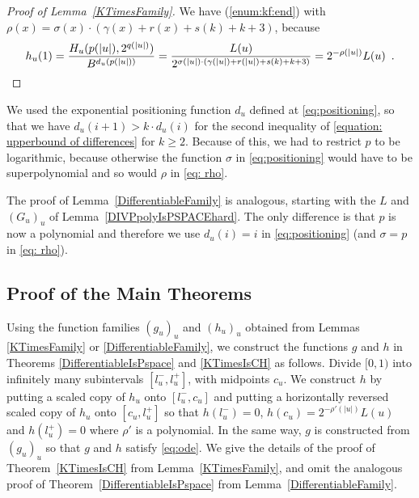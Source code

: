 \begin{proof}[Proof of Lemma~\ref{KTimesFamily}]
We have (\ref{enum:kf:end}) with
  $\rho(x) = \sigma(x) \cdot (\gamma(x)+r(x)+s(k)+k+3)$, because
  \begin{equation}
\label{eq: rho}
   h_u(1) 
   = \frac{H_u(p(|u|), 2^{q(|u|)})}{B^{d_u(p(|u|))}} 
   = \frac{L(u)}{2^{\sigma(|u|) \cdot (\gamma(|u|)+r(|u|)+s(k)+k+3)}} 
   = 2^{-\rho(|u|)} L(u)  \enspace . \qedhere
  \end{equation}
\end{proof}

We used the exponential positioning function $d _u$ 
defined at \eqref{eq:positioning}, 
so that we have $d _u (i + 1) > k \cdot d _u (i)$ for the 
second inequality of \eqref{equation: upperbound of differences}
for $k \geq 2$. 
Because of this, we had to restrict $p$ to be logarithmic, 
because otherwise the function $\sigma$ in \eqref{eq:positioning}
would have to be superpolynomial and so would $\rho$ in \eqref{eq: rho}. 

The proof of Lemma~\ref{DifferentiableFamily} is analogous, 
starting with the $L$ and $(G_u)_u$ of Lemma~\ref{DIVPpolyIsPSPACEhard}. 
The only difference is that $p$ is now a polynomial 
and therefore we use $d _u (i) = i$ in \eqref{eq:positioning}
(and $\sigma = p$ in \eqref{eq: rho}). 

\subsection{Proof of the Main Theorems}
\label{subsection: proof of theorems}
Using the function families $(g_u)_u$ and $(h_u)_u$ 
obtained from Lemmas \ref{KTimesFamily} or \ref{DifferentiableFamily}, 
we construct the functions $g$ and $h$ in 
Theorems \ref{DifferentiableIsPspace} and \ref{KTimesIsCH} as follows. 
Divide $[0,1)$ into infinitely many subintervals $[l^-_u, l^+_u]$,
with midpoints $c_u$.
We construct $h$ by putting a scaled copy of $h_u$ onto $[l^-_u, c_u]$ and
putting a horizontally reversed scaled copy of $h_u$ onto $[c_u, l^+_u]$ 
so that $h(l^-_u) = 0$, $h(c_u) = 2^{-\rho'(|u|)} L(u)$ and $h(l^+_u) = 0$ where $\rho'$ is a polynomial.
In the same way, $g$ is constructed from $(g_u)_u$ so that $g$ and $h$ satisfy \eqref{eq:ode}.
We give the details of the proof of 
Theorem~\ref{KTimesIsCH} from Lemma~\ref{KTimesFamily}, 
and omit the analogous proof of Theorem~\ref{DifferentiableIsPspace} 
from Lemma~\ref{DifferentiableFamily}. 


